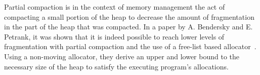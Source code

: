 

Partial compaction is in the context of memory management the act of compacting a small portion of the heap to decrease the amount of fragmentation in the part of the heap that was compacted. In a paper by A. Bendersky and E. Petrank, it was shown that it is indeed possible to reach lower levels of fragmentation with partial compaction and the use of a free-list based allocator~\cite{partial-compaction}. Using a non-moving allocator, they derive an upper and lower bound to the necessary size of the heap to satisfy the executing program's allocations.